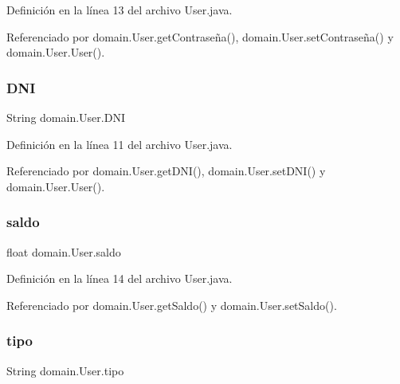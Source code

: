 Definición en la línea 13 del archivo User.\+java.



Referenciado por domain.\+User.\+get\+Contraseña(), domain.\+User.\+set\+Contraseña() y domain.\+User.\+User().

\mbox{\label{classdomain_1_1User_a9f89fcc3016d3a74f4660f1e3c133882}} 
\subsubsection{\texorpdfstring{DNI}{DNI}}
{\footnotesize\ttfamily String domain.\+User.\+D\+NI\hspace{0.3cm}{\ttfamily [private]}}



Definición en la línea 11 del archivo User.\+java.



Referenciado por domain.\+User.\+get\+D\+N\+I(), domain.\+User.\+set\+D\+N\+I() y domain.\+User.\+User().

\mbox{\label{classdomain_1_1User_abfe10a19b15929745bc34610db010938}} 
\subsubsection{\texorpdfstring{saldo}{saldo}}
{\footnotesize\ttfamily float domain.\+User.\+saldo\hspace{0.3cm}{\ttfamily [private]}}



Definición en la línea 14 del archivo User.\+java.



Referenciado por domain.\+User.\+get\+Saldo() y domain.\+User.\+set\+Saldo().

\mbox{\label{classdomain_1_1User_a3e3d2bcaf19448f31142d301db0493be}} 
\subsubsection{\texorpdfstring{tipo}{tipo}}
{\footnotesize\ttfamily String domain.\+User.\+tipo\hspace{0.3cm}{\ttfamily [private]}}



